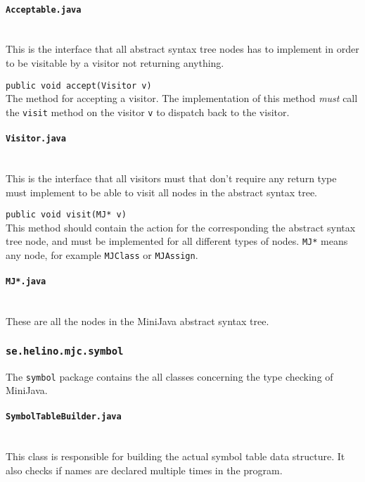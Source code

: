 \documentclass[11pt,oneside,a4paper]{article}
\begin{document}
\paragraph{\texttt{Acceptable.java}} \hfill \\
This is the interface that all abstract syntax tree nodes has to implement in
order to be visitable by a visitor not returning anything.
\begin{description}
    \item{\texttt{public void accept(Visitor v)}} \hfill \\
        The method for accepting a visitor. The implementation of this method 
        \emph{must} call the
        \texttt{visit} method on the visitor \texttt{v} to dispatch back to the
        visitor. 
\end{description}


\paragraph{\texttt{Visitor.java}} \hfill \\
This is the interface that all visitors must that don't require any return type
must implement to be able to visit all nodes in the abstract syntax tree.
\begin{description}
    \item{\texttt{public void visit(MJ* v)}} \hfill \\
    This method should contain the action for the corresponding the abstract
    syntax tree node, and must be implemented for all different types of nodes.
    \texttt{MJ*} means any node, for example \texttt{MJClass} or
    \texttt{MJAssign}.
\end{description}

\paragraph{\texttt{MJ*.java}} \hfill \\
These are all the nodes in the MiniJava abstract syntax tree.

\subsubsection{\texttt{se.helino.mjc.symbol}}
The \texttt{symbol} package contains the all classes concerning the type
checking of MiniJava.
\paragraph{\texttt{SymbolTableBuilder.java}} \hfill \\
This class is responsible for building the actual symbol table data structure.
It also checks if names are declared multiple times in the program.
\end{document}
